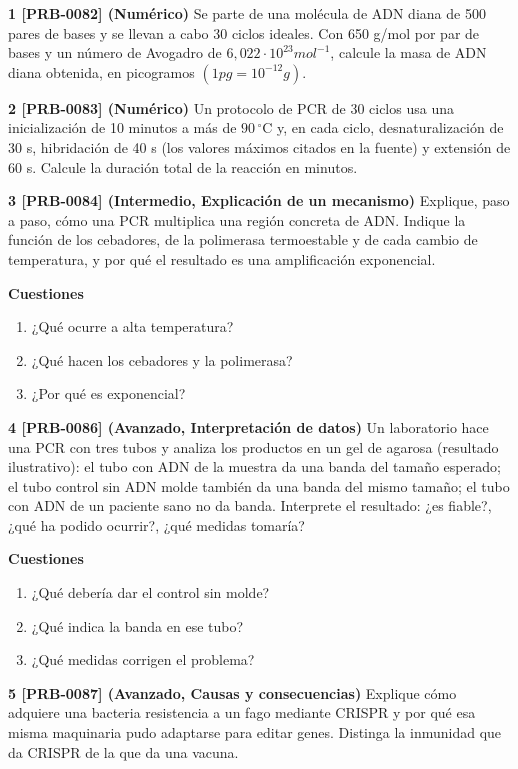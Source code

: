\documentclass{book}
\begin{document}
\begin{tcolorbox}[title={Ejercicios}, studiumworked, breakable]

\noindent\textbf{1 [PRB-0082] (Numérico)}
Se parte de una molécula de ADN diana de 500 pares de bases y se llevan a cabo 30 ciclos ideales. Con 650 g/mol por par de bases y un número de Avogadro de \(6,022\cdot10^{23} mol^{-1}\), calcule la masa de ADN diana obtenida, en picogramos \((1 pg = 10^{-12} g)\).


\noindent\textbf{2 [PRB-0083] (Numérico)}
Un protocolo de PCR de 30 ciclos usa una inicialización de 10 minutos a más de \(90\,{}^{\circ}\mathrm{C}\) y, en cada ciclo, desnaturalización de 30 s, hibridación de 40 s (los valores máximos citados en la fuente) y extensión de 60 s. Calcule la duración total de la reacción en minutos.


\noindent\textbf{3 [PRB-0084] (Intermedio, Explicación de un mecanismo)}
Explique, paso a paso, cómo una PCR multiplica una región concreta de ADN. Indique la función de los cebadores, de la polimerasa termoestable y de cada cambio de temperatura, y por qué el resultado es una amplificación exponencial.


\noindent\textbf{Cuestiones}
\begin{enumerate}
\item ¿Qué ocurre a alta temperatura?
\item ¿Qué hacen los cebadores y la polimerasa?
\item ¿Por qué es exponencial?
\end{enumerate}

\noindent\textbf{4 [PRB-0086] (Avanzado, Interpretación de datos)}
Un laboratorio hace una PCR con tres tubos y analiza los productos en un gel de agarosa (resultado ilustrativo): el tubo con ADN de la muestra da una banda del tamaño esperado; el tubo control sin ADN molde también da una banda del mismo tamaño; el tubo con ADN de un paciente sano no da banda. Interprete el resultado: ¿es fiable?, ¿qué ha podido ocurrir?, ¿qué medidas tomaría?


\noindent\textbf{Cuestiones}
\begin{enumerate}
\item ¿Qué debería dar el control sin molde?
\item ¿Qué indica la banda en ese tubo?
\item ¿Qué medidas corrigen el problema?
\end{enumerate}

\noindent\textbf{5 [PRB-0087] (Avanzado, Causas y consecuencias)}
Explique cómo adquiere una bacteria resistencia a un fago mediante CRISPR y por qué esa misma maquinaria pudo adaptarse para editar genes. Distinga la inmunidad que da CRISPR de la que da una vacuna.



\end{tcolorbox}
\end{document}

